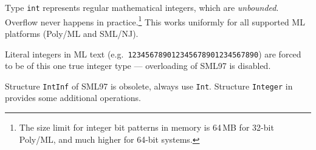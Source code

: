 \begin{isabellebody}
\begin{isamarkuptext}
  \begin{description}

  \item Type \verb|int| represents regular mathematical integers,
  which are \emph{unbounded}.  Overflow never happens in
  practice.\footnote{The size limit for integer bit patterns in memory
  is 64\,MB for 32-bit Poly/ML, and much higher for 64-bit systems.}
  This works uniformly for all supported ML platforms (Poly/ML and
  SML/NJ).

  Literal integers in ML text (e.g.\ \verb|123456789012345678901234567890|) are forced to be of this one true
  integer type --- overloading of SML97 is disabled.

  Structure \verb|IntInf| of SML97 is obsolete, always use
  \verb|Int|.  Structure \verb|Integer| in \hyperlink{file.~~/src/Pure/General/integer.ML}{\mbox{}} provides some additional
  operations.


\end{description}
\end{isamarkuptext}
\end{isabellebody}
